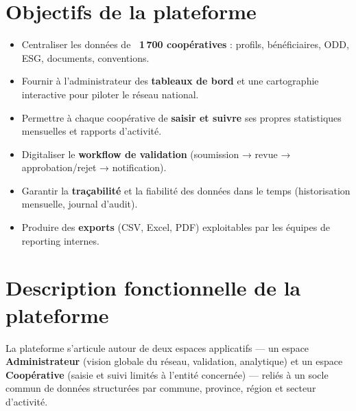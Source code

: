 \documentclass[11pt,a4paper]{article}
\begin{document}
\section{Objectifs de la plateforme}
\begin{itemize}
  \item Centraliser les données de \textbf{~1\,700 coopératives} : profils, bénéficiaires, ODD, ESG, documents, conventions.
  \item Fournir à l'administrateur des \textbf{tableaux de bord} et une cartographie interactive pour piloter le réseau national.
  \item Permettre à chaque coopérative de \textbf{saisir et suivre} ses propres statistiques mensuelles et rapports d'activité.
  \item Digitaliser le \textbf{workflow de validation} (soumission → revue → approbation/rejet → notification).
  \item Garantir la \textbf{traçabilité} et la fiabilité des données dans le temps (historisation mensuelle, journal d'audit).
  \item Produire des \textbf{exports} (CSV, Excel, PDF) exploitables par les équipes de reporting internes.
\end{itemize}

\section{Description fonctionnelle de la plateforme}
La plateforme s'articule autour de deux espaces applicatifs — un espace \textbf{Administrateur}
(vision globale du réseau, validation, analytique) et un espace \textbf{Coopérative} (saisie et suivi
limités à l'entité concernée) — reliés à un socle commun de données structurées par commune,
province, région et secteur d'activité.
\end{document}
